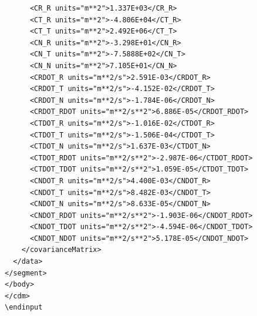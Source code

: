 \begin{lstlisting}
      <CR_R units="m**2">1.337E+03</CR_R>
      <CT_R units="m**2">-4.806E+04</CT_R>
      <CT_T units="m**2">2.492E+06</CT_T>
      <CN_R units="m**2">-3.298E+01</CN_R>
      <CN_T units="m**2">-7.5888E+02</CN_T>
      <CN_N units="m**2">7.105E+01</CN_N>
      <CRDOT_R units="m**2/s">2.591E-03</CRDOT_R>
      <CRDOT_T units="m**2/s">-4.152E-02</CRDOT_T>
      <CRDOT_N units="m**2/s">-1.784E-06</CRDOT_N>
      <CRDOT_RDOT units="m**2/s**2">6.886E-05</CRDOT_RDOT>
      <CTDOT_R units="m**2/s">-1.016E-02</CTDOT_R>
      <CTDOT_T units="m**2/s">-1.506E-04</CTDOT_T>
      <CTDOT_N units="m**2/s">1.637E-03</CTDOT_N>
      <CTDOT_RDOT units="m**2/s**2">-2.987E-06</CTDOT_RDOT>
      <CTDOT_TDOT units="m**2/s**2">1.059E-05</CTDOT_TDOT>
      <CNDOT_R units="m**2/s">4.400E-03</CNDOT_R>
      <CNDOT_T units="m**2/s">8.482E-03</CNDOT_T>
      <CNDOT_N units="m**2/s">8.633E-05</CNDOT_N>
      <CNDOT_RDOT units="m**2/s**2">-1.903E-06</CNDOT_RDOT>
      <CNDOT_TDOT units="m**2/s**2">-4.594E-06</CNDOT_TDOT>
      <CNDOT_NDOT units="m**2/s**2">5.178E-05</CNDOT_NDOT>
    </covarianceMatrix>
  </data>
</segment>
</body>
</cdm>
\endinput
\end{lstlisting}